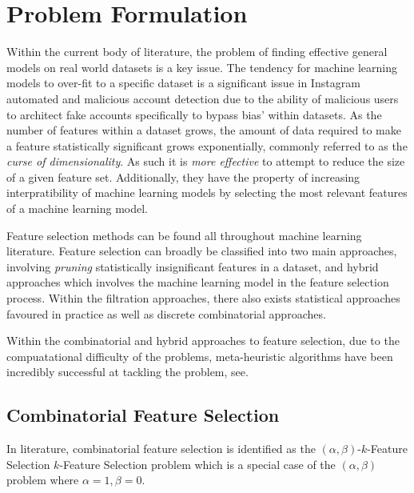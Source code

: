 \documentclass[conference]{IEEEtran}
\begin{document}
\section{Problem Formulation}\label{sec:problem-formulation}

Within the current body of literature, the problem of finding effective general models on real world datasets is a key issue. The tendency for machine learning models to over-fit to a specific dataset is a significant issue in Instagram automated and malicious account detection due to the ability of malicious users to architect fake accounts specifically to bypass bias' within datasets. As the number of features within a dataset grows, the amount of data required to make a feature statistically significant grows exponentially, commonly referred to as the \textit{curse of dimensionality}. As such it is \textit{more effective} to attempt to reduce the size of a given feature set. Additionally, they have the property of increasing interpratibility of machine learning models by selecting the most relevant features of a machine learning model.

Feature selection methods can be found all throughout machine learning literature. Feature selection can broadly be classified into two main approaches, involving \textit{pruning} statistically insignificant features in a dataset, and hybrid approaches\cite{AkyonKalfaoglu2019,KaushikEtAl2022} which involves the machine learning model in the feature selection process. Within the filtration approaches, there also exists statistical approaches favoured in practice\cite{PedregosaEtAl2011} as well as discrete combinatorial approaches\cite{MathiesonEtAl2017}.

Within the combinatorial and hybrid approaches to feature selection, due to the compuatational difficulty of the problems, meta-heuristic algorithms have been incredibly successful at tackling the problem, see\cite{AkyonKalfaoglu2019,MathiesonEtAl2017}.

\subsection{Combinatorial Feature Selection}

In literature, combinatorial feature selection is identified as the $(\alpha,\beta)$-$k$-Feature Selection $k$-Feature Selection problem which is a special case of the $(\alpha,\beta)$ problem where $\alpha=1,\beta=0$.
\end{document}
